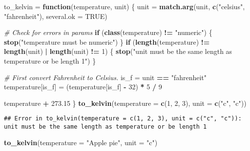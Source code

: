 \documentclass[
]{article}
\newenvironment{Shaded}{\begin{snugshade}}{\end{snugshade}}
\newcommand{\CommentTok}[1]{\textcolor[rgb]{0.56,0.35,0.01}{\textit{#1}}}
\newcommand{\ControlFlowTok}[1]{\textcolor[rgb]{0.13,0.29,0.53}{\textbf{#1}}}
\newcommand{\DataTypeTok}[1]{\textcolor[rgb]{0.13,0.29,0.53}{#1}}
\newcommand{\DecValTok}[1]{\textcolor[rgb]{0.00,0.00,0.81}{#1}}
\newcommand{\FloatTok}[1]{\textcolor[rgb]{0.00,0.00,0.81}{#1}}
\newcommand{\KeywordTok}[1]{\textcolor[rgb]{0.13,0.29,0.53}{\textbf{#1}}}
\newcommand{\NormalTok}[1]{#1}
\newcommand{\OperatorTok}[1]{\textcolor[rgb]{0.81,0.36,0.00}{\textbf{#1}}}
\newcommand{\OtherTok}[1]{\textcolor[rgb]{0.56,0.35,0.01}{#1}}
\newcommand{\StringTok}[1]{\textcolor[rgb]{0.31,0.60,0.02}{#1}}
\begin{document}
\begin{Shaded}
\begin{Highlighting}[]
\NormalTok{to\_kelvin =}\StringTok{ }\ControlFlowTok{function}\NormalTok{(temperature, unit) \{}
\NormalTok{  unit =}\StringTok{ }\KeywordTok{match.arg}\NormalTok{(unit, }\KeywordTok{c}\NormalTok{(}\StringTok{"celsius"}\NormalTok{, }\StringTok{"fahrenheit"}\NormalTok{), }\DataTypeTok{several.ok =} \OtherTok{TRUE}\NormalTok{)}

  \CommentTok{\# Check for errors in params}
  \ControlFlowTok{if}\NormalTok{ (}\KeywordTok{class}\NormalTok{(temperature) }\OperatorTok{!=}\StringTok{ "numeric"}\NormalTok{) \{}
    \KeywordTok{stop}\NormalTok{(}\StringTok{"temperature must be numeric"}\NormalTok{)}
\NormalTok{  \}}
  \ControlFlowTok{if}\NormalTok{ (}\KeywordTok{length}\NormalTok{(temperature) }\OperatorTok{!=}\StringTok{ }\KeywordTok{length}\NormalTok{(unit) }\OperatorTok{|}\StringTok{ }\KeywordTok{length}\NormalTok{(unit) }\OperatorTok{!=}\StringTok{ }\DecValTok{1}\NormalTok{) \{}
    \KeywordTok{stop}\NormalTok{(}\StringTok{"unit must be the same length as temperature or be length 1"}\NormalTok{)}
\NormalTok{  \}}

  \CommentTok{\# First convert Fahrenheit to Celsius.}
\NormalTok{  is\_f =}\StringTok{ }\NormalTok{unit }\OperatorTok{==}\StringTok{ "fahrenheit"}
\NormalTok{  temperature[is\_f] =}\StringTok{ }\NormalTok{(temperature[is\_f] }\OperatorTok{{-}}\StringTok{ }\DecValTok{32}\NormalTok{) }\OperatorTok{*}\StringTok{ }\DecValTok{5} \OperatorTok{/}\StringTok{ }\DecValTok{9}

\NormalTok{  temperature }\OperatorTok{+}\StringTok{ }\FloatTok{273.15}
\NormalTok{\}}
\KeywordTok{to\_kelvin}\NormalTok{(}\DataTypeTok{temperature =} \KeywordTok{c}\NormalTok{(}\DecValTok{1}\NormalTok{, }\DecValTok{2}\NormalTok{, }\DecValTok{3}\NormalTok{), }\DataTypeTok{unit =} \KeywordTok{c}\NormalTok{(}\StringTok{"c"}\NormalTok{, }\StringTok{"c"}\NormalTok{))}
\end{Highlighting}
\end{Shaded}

\begin{verbatim}
## Error in to_kelvin(temperature = c(1, 2, 3), unit = c("c", "c")): unit must be the same length as temperature or be length 1
\end{verbatim}

\begin{Shaded}
\begin{Highlighting}[]
\KeywordTok{to\_kelvin}\NormalTok{(}\DataTypeTok{temperature =} \StringTok{"Apple pie"}\NormalTok{, }\DataTypeTok{unit =} \StringTok{"c"}\NormalTok{)}
\end{Highlighting}
\end{Shaded}
\end{document}
